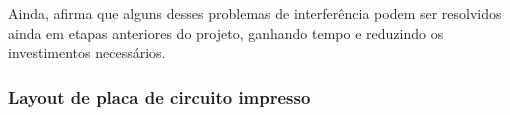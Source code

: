             Ainda,  afirma que alguns desses problemas de interferência podem ser resolvidos ainda em etapas anteriores do projeto, ganhando tempo e reduzindo os investimentos necessários. 
            
            
            
            
            
            
            
            
            
            
            \subsubsection{Layout de placa de circuito impresso} \label{cap:fund_emc_conv_mitig_cond}
            

